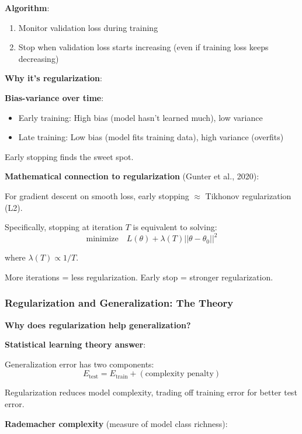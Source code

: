 \documentclass[11pt,oneside]{book}
\begin{document}
\textbf{Algorithm}:
\begin{enumerate}
    \item Monitor validation loss during training
    \item Stop when validation loss starts increasing (even if training loss keeps decreasing)
\end{enumerate}

\textbf{Why it's regularization}:

\textbf{Bias-variance over time}:
\begin{itemize}
    \item Early training: High bias (model hasn't learned much), low variance
    \item Late training: Low bias (model fits training data), high variance (overfits)
\end{itemize}

Early stopping finds the sweet spot.

\textbf{Mathematical connection to regularization} (Gunter et al., 2020):

For gradient descent on smooth loss, early stopping $\approx$ Tikhonov regularization (L2).

Specifically, stopping at iteration $T$ is equivalent to solving:
\begin{equation}
\text{minimize} \quad L(\theta) + \lambda(T)||\theta - \theta_0||^2
\end{equation}

where $\lambda(T) \propto 1/T$.

More iterations = less regularization. Early stop = stronger regularization.

\subsubsection{Regularization and Generalization: The Theory}

\textbf{Why does regularization help generalization?}

\textbf{Statistical learning theory answer}:

Generalization error has two components:
\begin{equation}
E_{\text{test}} = E_{\text{train}} + (\text{complexity penalty})
\end{equation}

Regularization reduces model complexity, trading off training error for better test error.

\textbf{Rademacher complexity} (measure of model class richness):
\end{document}
